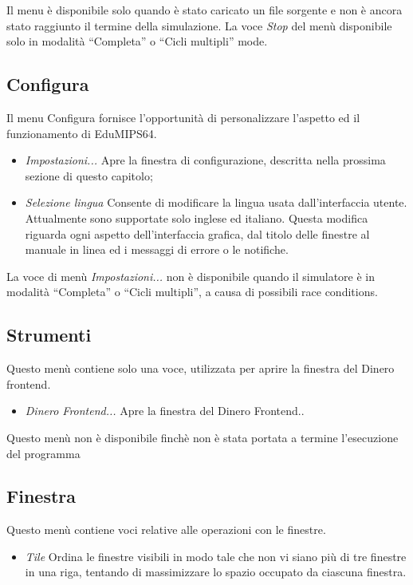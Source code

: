 \documentclass[letterpaper,10pt,english]{sphinxmanual}
\begin{document}
Il menu è disponibile solo quando è stato caricato un file sorgente e
non è ancora stato raggiunto il termine della simulazione.  La voce
\emph{Stop} del menù  disponibile solo in modalità ``Completa'' o
``Cicli multipli'' mode.


\subsection{Configura}
\label{user-interface:configura}
Il menu Configura fornisce l'opportunità di personalizzare l'aspetto ed il
funzionamento di EduMIPS64.
\begin{itemize}
\item {} 
\emph{Impostazioni...} Apre la finestra di configurazione, descritta nella
prossima sezione di questo capitolo;

\item {} 
\emph{Selezione lingua} Consente di modificare la lingua usata
dall'interfaccia utente. Attualmente sono supportate solo inglese ed
italiano. Questa modifica riguarda ogni aspetto dell'interfaccia grafica,
dal titolo delle finestre al manuale in linea ed i messaggi di errore o le
notifiche.

\end{itemize}

La voce di menù \emph{Impostazioni...} non è disponibile quando il
simulatore è in modalità ``Completa'' o ``Cicli multipli'', a causa di
possibili race conditions.


\subsection{Strumenti}
\label{user-interface:strumenti}
Questo menù contiene solo una voce, utilizzata per aprire la finestra del
Dinero frontend.
\begin{itemize}
\item {} 
\emph{Dinero Frontend...} Apre la finestra del Dinero Frontend..

\end{itemize}

Questo menù non è disponibile finchè non è stata portata a
termine l'esecuzione del programma


\subsection{Finestra}
\label{user-interface:finestra}
Questo menù contiene voci relative alle operazioni con le finestre.
\begin{itemize}
\item {} 
\emph{Tile} Ordina le finestre visibili in modo tale che non vi siano
più di tre finestre in una riga, tentando di massimizzare lo spazio
occupato da ciascuna finestra.

\end{itemize}
\end{document}
